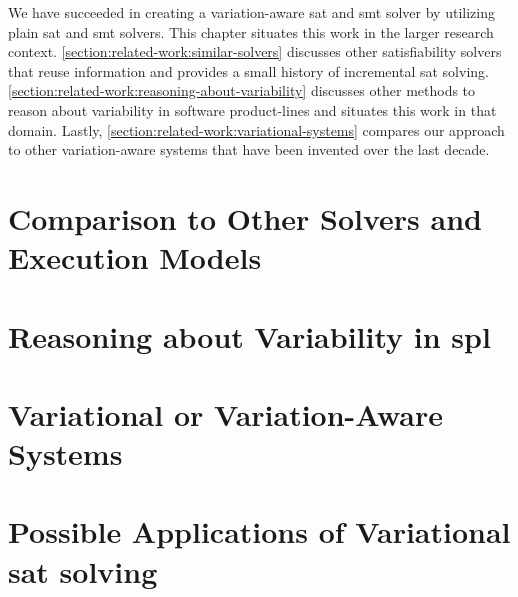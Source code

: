 \label{chapter:related-work}
%
We have succeeded in creating a variation-aware \ac{sat} and \ac{smt} solver by
utilizing plain \ac{sat} and \ac{smt} solvers. This chapter situates this work
in the larger research context. \autoref{section:related-work:similar-solvers}
discusses other satisfiability solvers that reuse information and provides a
small history of incremental \ac{sat} solving.
\autoref{section:related-work:reasoning-about-variability} discusses other
methods to reason about variability in software product-lines and situates this
work in that domain. Lastly, \autoref{section:related-work:variational-systems}
compares our approach to other variation-aware systems that have been invented
over the last decade.
%
\section{Comparison to Other Solvers and Execution Models}

%
\section{Reasoning about Variability in \ac{spl}}

%
\section{Variational or Variation-Aware Systems}

%
\section{Possible Applications of Variational \acs{sat} solving}


